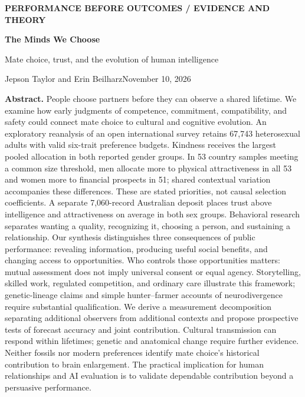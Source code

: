 \documentclass[10pt,twocolumn,letterpaper]{article}
\begin{document}
\onecolumn
\thispagestyle{empty}
{\sffamily\small\bfseries\color{teal}PERFORMANCE BEFORE OUTCOMES \; / \; EVIDENCE AND THEORY\par}
\vspace{5pt}
{\fontsize{29}{32}\selectfont\bfseries\color{ink}The Minds We Choose\par}
\vspace{4pt}
{\fontsize{14.5}{17.5}\selectfont\color{ink}Mate choice, trust, and the evolution of human intelligence\par}
\vspace{6pt}
{\sffamily Jepson Taylor \; and \; Erin Beilharz\hfill\small November 10, 2026\par}
\vspace{8pt}
\noindent\begin{minipage}{\textwidth}\small
\textbf{Abstract.} People choose partners before they can observe a shared lifetime. We examine how early judgments of competence, commitment, compatibility, and safety could connect mate choice to cultural and cognitive evolution. An exploratory reanalysis of an open international survey retains 67,743 heterosexual adults with valid six-trait preference budgets. Kindness receives the largest pooled allocation in both reported gender groups. In 53 country samples meeting a common size threshold, men allocate more to physical attractiveness in all 53 and women more to financial prospects in 51; shared contextual variation accompanies these differences. These are stated priorities, not causal selection coefficients. A separate 7,060-record Australian deposit places trust above intelligence and attractiveness on average in both sex groups. Behavioral research separates wanting a quality, recognizing it, choosing a person, and sustaining a relationship. Our synthesis distinguishes three consequences of public performance: revealing information, producing useful social benefits, and changing access to opportunities. Who controls those opportunities matters: mutual assessment does not imply universal consent or equal agency. Storytelling, skilled work, regulated competition, and ordinary care illustrate this framework; genetic-lineage claims and simple hunter--farmer accounts of neurodivergence require substantial qualification. We derive a measurement decomposition separating additional observers from additional contexts and propose prospective tests of forecast accuracy and joint contribution. Cultural transmission can respond within lifetimes; genetic and anatomical change require further evidence. Neither fossils nor modern preferences identify mate choice's historical contribution to brain enlargement. The practical implication for human relationships and AI evaluation is to validate dependable contribution beyond a persuasive performance.
\end{minipage}
\end{document}
